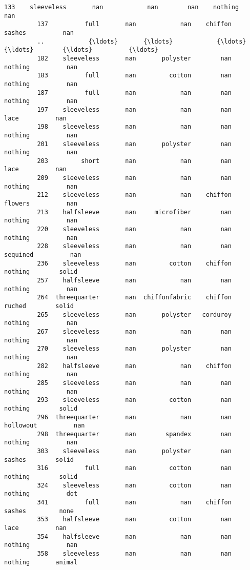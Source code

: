 \documentclass[11pt]{article}
\begin{document}
\begin{Verbatim}[commandchars=\\\{\}]
         133    sleeveless       nan            nan        nan    nothing          nan   
         137          full       nan            nan    chiffon     sashes          nan   
         ..            {\ldots}       {\ldots}            {\ldots}        {\ldots}        {\ldots}          {\ldots}   
         182    sleeveless       nan       polyster        nan    nothing          nan   
         183          full       nan         cotton        nan    nothing          nan   
         187          full       nan            nan        nan    nothing          nan   
         197    sleeveless       nan            nan        nan       lace          nan   
         198    sleeveless       nan            nan        nan    nothing          nan   
         201    sleeveless       nan       polyster        nan    nothing          nan   
         203         short       nan            nan        nan       lace          nan   
         209    sleeveless       nan            nan        nan    nothing          nan   
         212    sleeveless       nan            nan    chiffon    flowers          nan   
         213    halfsleeve       nan     microfiber        nan    nothing          nan   
         220    sleeveless       nan            nan        nan    nothing          nan   
         228    sleeveless       nan            nan        nan   sequined          nan   
         236    sleeveless       nan         cotton    chiffon    nothing        solid   
         257    halfsleeve       nan            nan        nan    nothing          nan   
         264  threequarter       nan  chiffonfabric    chiffon     ruched        solid   
         265    sleeveless       nan       polyster   corduroy    nothing          nan   
         267    sleeveless       nan            nan        nan    nothing          nan   
         270    sleeveless       nan       polyster        nan    nothing          nan   
         282    halfsleeve       nan            nan    chiffon    nothing          nan   
         285    sleeveless       nan            nan        nan    nothing          nan   
         293    sleeveless       nan         cotton        nan    nothing        solid   
         296  threequarter       nan            nan        nan  hollowout          nan   
         298  threequarter       nan        spandex        nan    nothing          nan   
         303    sleeveless       nan       polyster        nan     sashes        solid   
         316          full       nan         cotton        nan    nothing        solid   
         324    sleeveless       nan         cotton        nan    nothing          dot   
         341          full       nan            nan    chiffon     sashes         none   
         353    halfsleeve       nan         cotton        nan       lace          nan   
         354    halfsleeve       nan            nan        nan    nothing          nan   
         358    sleeveless       nan            nan        nan    nothing       animal   
         

\end{Verbatim}
\end{document}
